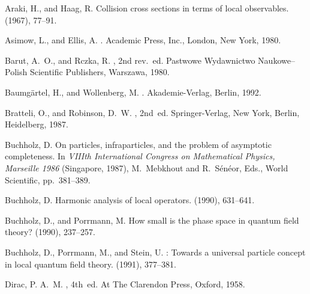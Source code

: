 \documentclass[a4paper,a4paper]{article}
\numberwithin{equation}{section}
\theoremstyle{definition}
\theoremstyle{plain}
\theoremstyle{remark}
\begin{document}
\providecommand{\SortNoop}[1]{}
\begin{thebibliography}{10}

{\sc Araki, H., and Haag, R.}
\newblock Collision cross sections in terms of local observables.
 (1967), 77--91.

{\sc Asimow, L., and Ellis, A.}
.
\newblock Academic Press, Inc., London, New York, 1980.

{\sc Barut, A.~O., and Rczka, R.}
, 2nd rev.~ed.
\newblock Pastwowe Wydawnictwo Naukowe--Polish Scientific
  Publishers, Warszawa, 1980.

{\sc Baumg\"artel, H., and Wollenberg, M.}
.
\newblock Akademie-Verlag, Berlin, 1992.

{\sc Bratteli, O., and Robinson, D.~W.}
, 2nd~ed.
\newblock Springer-Verlag, New York, Berlin, Heidelberg, \SortNoop{79}1987.

{\sc Buchholz, D.}
\newblock On particles, infraparticles, and the problem of asymptotic
  completeness.
\newblock In {\em VIIIth International Congress on Mathematical Physics,
  \textnormal{Marseille 1986}\/} (Singapore, 1987), M.~Mebkhout and
  R.~S\'{e}n\'{e}or, Eds., World Scientific, pp.~381--389.

{\sc Buchholz, D.}
\newblock Harmonic analysis of local operators.
 (1990), 631--641.

{\sc Buchholz, D., and Porrmann, M.}
\newblock How small is the phase space in quantum field theory?
 (1990),
  237--257.

{\sc Buchholz, D., Porrmann, M., and Stein, U.}
: Towards a universal particle concept in local
  quantum field theory.
 (1991), 377--381.

{\sc Dirac, P. A.~M.}
, 4th~ed.
\newblock At The Clarendon Press, Oxford, 1958.


\end{thebibliography}
\end{document}

